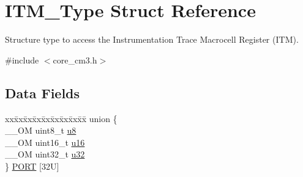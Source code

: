 \hypertarget{struct_i_t_m___type}{}\section{I\+T\+M\+\_\+\+Type Struct Reference}
\label{struct_i_t_m___type}


Structure type to access the Instrumentation Trace Macrocell Register (I\+TM).  




{\ttfamily \#include $<$core\+\_\+cm3.\+h$>$}

\subsection*{Data Fields}
\begin{DoxyCompactItemize}
\item 
\begin{tabbing}
xx\=xx\=xx\=xx\=xx\=xx\=xx\=xx\=xx\=\kill
union \{\\
\>\_\_OM uint8\_t \hyperlink{struct_i_t_m___type_a4c0550e859d614c607bd4b575f05425c}{u8}\\
\>\_\_OM uint16\_t \hyperlink{struct_i_t_m___type_ae93660eefe2482a8564fae9a1ca39739}{u16}\\
\>\_\_OM uint32\_t \hyperlink{struct_i_t_m___type_ae89dd50f788f12863c681fba1a5b60d1}{u32}\\
\} \hyperlink{struct_i_t_m___type_a5d8a5967362b507fd70e4c31ce7c5c3f}{PORT} \mbox{[}32U\mbox{]}\\


\end{tabbing}
\end{DoxyCompactItemize}
